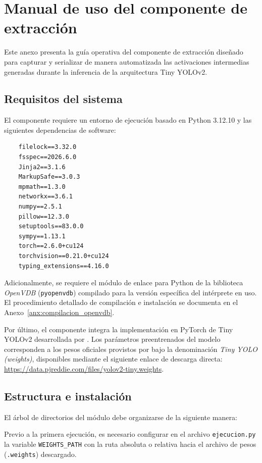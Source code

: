 \chapter[Uso del componente de extracción]{Manual de uso del componente de extracción}
\label{anx:manual_extraccion}
Este anexo presenta la guía operativa del componente de extracción diseñado para capturar y serializar de manera automatizada las 
activaciones intermedias generadas durante la inferencia de la arquitectura Tiny YOLOv2.

\section{Requisitos del sistema}
El componente requiere un entorno de ejecución basado en Python 3.12.10 y las siguientes dependencias de software:

\begin{verbatim}
    filelock==3.32.0
    fsspec==2026.6.0
    Jinja2==3.1.6
    MarkupSafe==3.0.3
    mpmath==1.3.0
    networkx==3.6.1
    numpy==2.5.1
    pillow==12.3.0
    setuptools==83.0.0
    sympy==1.13.1
    torch==2.6.0+cu124
    torchvision==0.21.0+cu124
    typing_extensions==4.16.0
\end{verbatim}
Adicionalmente, se requiere el módulo de enlace para Python de la biblioteca \textit{OpenVDB} (\texttt{pyopenvdb}) 
compilado para la versión específica del intérprete en uso. El procedimiento detallado de compilación e instalación 
se documenta en el Anexo~\ref{anx:compilacion_openvdb}.
\medskip

Por último, el componente integra la implementación en PyTorch de Tiny YOLOv2 desarrollada por \textcite{yolov2_implementation}. 
Los parámetros preentrenados del modelo corresponden a los pesos oficiales provistos por \textcite{yolov3} bajo la denominación 
\textit{Tiny YOLO (weights)}, disponibles mediante el siguiente enlace de descarga directa:
\url{https://data.pjreddie.com/files/yolov2-tiny.weights}.

\section{Estructura e instalación}
El árbol de directorios del módulo debe organizarse de la siguiente manera:


Previo a la primera ejecución, es necesario configurar en el archivo \texttt{ejecucion.py} la variable \texttt{WEIGHTS\_PATH} 
con la ruta absoluta o relativa hacia el archivo de pesos (\texttt{.weights}) descargado.

